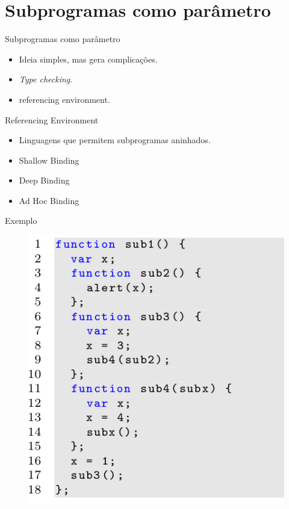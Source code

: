
\section{Subprogramas como parâmetro}
\begin{frame}{Subprogramas como parâmetro}
	\begin{itemize}
	  \item Ideia simples, mas gera complicações.
	  \item \emph{Type checking}.
	  \item referencing environment.
	\end{itemize}
\end{frame}

\begin{frame}{Referencing Environment}
	\begin{itemize}
	  \item Linguagens que permitem subprogramas aninhados.
	  \item Shallow Binding
	  \item Deep Binding
	  \item Ad Hoc Binding
	\end{itemize}
\end{frame}

\begin{frame}{Exemplo}
	\begin{figure}[ht!]
		\centering
		\includegraphics[scale=0.4]{./imgs/js-original}
	\end{figure}
\end{frame}

